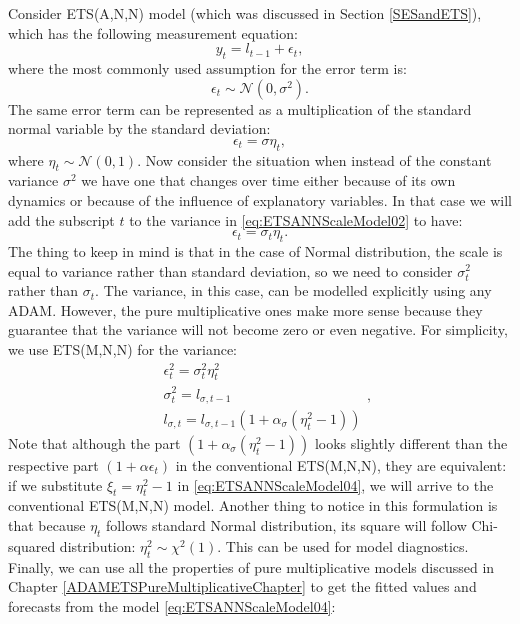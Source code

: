\documentclass[
]{book}
\theoremstyle{definition}
\theoremstyle{definition}
\theoremstyle{definition}
\theoremstyle{definition}
\theoremstyle{remark}
\begin{document}
Consider ETS(A,N,N) model (which was discussed in Section \ref{SESandETS}), which has the following measurement equation:
\begin{equation}
    y_t = l_{t-1} + \epsilon_t,
    \label{eq:ETSANNScaleModel01}
\end{equation}
where the most commonly used assumption for the error term is:
\begin{equation*}
    \epsilon_t \sim \mathcal{N}(0, \sigma^2) .
\end{equation*}
The same error term can be represented as a multiplication of the standard normal variable by the standard deviation:
\begin{equation}
    \epsilon_t = \sigma \eta_t,
    \label{eq:ETSANNScaleModel02}
\end{equation}
where \(\eta_t \sim \mathcal{N}(0, 1)\). Now consider the situation when instead of the constant variance \(\sigma^2\) we have one that changes over time either because of its own dynamics or because of the influence of explanatory variables. In that case we will add the subscript \(t\) to the variance in \eqref{eq:ETSANNScaleModel02} to have:
\begin{equation}
    \epsilon_t = \sigma_t \eta_t.
    \label{eq:ETSANNScaleModel03}
\end{equation}
The thing to keep in mind is that in the case of Normal distribution, the scale is equal to variance rather than standard deviation, so we need to consider \(\sigma_t^2\) rather than \(\sigma_t\). The variance, in this case, can be modelled explicitly using any ADAM. However, the pure multiplicative ones make more sense because they guarantee that the variance will not become zero or even negative. For simplicity, we use ETS(M,N,N) for the variance:
\begin{equation}
  \begin{aligned}
    &\epsilon_t^2 = \sigma_t^2 \eta_t^2 \\
    &\sigma_t^2 = l_{\sigma,t-1} \\
    &l_{\sigma,t} = l_{\sigma,t-1} \left(1 + \alpha_\sigma (\eta_t^2-1)\right)
  \end{aligned},
  \label{eq:ETSANNScaleModel04}
\end{equation}
Note that although the part \(\left(1 + \alpha_\sigma (\eta_t^2-1)\right)\) looks slightly different than the respective part \(\left(1 + \alpha \epsilon_t \right)\) in the conventional ETS(M,N,N), they are equivalent: if we substitute \(\xi_t = \eta_t^2-1\) in \eqref{eq:ETSANNScaleModel04}, we will arrive to the conventional ETS(M,N,N) model. Another thing to notice in this formulation is that because \(\eta_t\) follows standard Normal distribution, its square will follow Chi-squared distribution: \(\eta_t^2 \sim \chi^2(1)\). This can be used for model diagnostics. Finally, we can use all the properties of pure multiplicative models discussed in Chapter \ref{ADAMETSPureMultiplicativeChapter} to get the fitted values and forecasts from the model \eqref{eq:ETSANNScaleModel04}:
\end{document}
